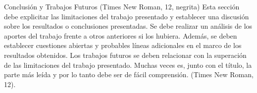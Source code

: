 Conclusión y Trabajos Futuros (Times New Roman, 12, negrita) 
Esta sección debe explicitar las limitaciones del trabajo presentado y establecer una discusión sobre los resultados o conclusiones presentadas. Se debe realizar un análisis de los aportes del trabajo frente a otros anteriores si los hubiera. Además, se deben establecer cuestiones abiertas y probables líneas adicionales en el marco de los resultados obtenidos. Los trabajos futuros se deben relacionar con la superación de las limitaciones del trabajo presentado. Muchas veces es, junto con el título, la parte más leída y por lo tanto debe ser de fácil comprensión. (Times New Roman, 12).
